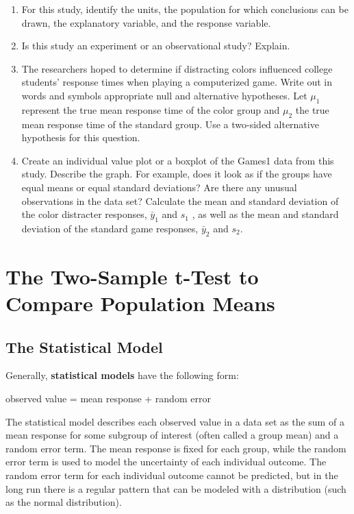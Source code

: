 \documentclass[
]{report}
\begin{document}
\begin{enumerate}
\def\labelenumi{\arabic{enumi}.}
\item
  For this study, identify the units, the population for which conclusions can be drawn, the explanatory variable, and the response variable.
\item
  Is this study an experiment or an observational study? Explain.
\item
  The researchers hoped to determine if distracting colors influenced college students' response times when playing a computerized game. Write out in words and symbols appropriate null and alternative hypotheses. Let \(\mu_1\) represent the true mean response time of the color group and \(\mu_2\) the true mean response time of the standard group. Use a two-sided alternative hypothesis for this question.
\item
  Create an individual value plot or a boxplot of the Games1 data from this study. Describe the graph. For example, does it look as if the groups have equal means or equal standard deviations? Are there any unusual observations in the data set? Calculate the mean and standard deviation of the color distracter responses, \(\bar{y}_1\) and \(s_1\) , as well as the mean and standard deviation of the standard game responses, \(\bar{y}_2\) and \(s_2\).
\end{enumerate}

\newpage

\section{The Two-Sample t-Test to Compare Population Means}\label{the-two-sample-t-test-to-compare-population-means}

\subsection{The Statistical Model}\label{the-statistical-model}

Generally, \textbf{statistical models} have the following form:

observed value = mean response + random error

The statistical model describes each observed value in a data set as the sum of a mean response for some subgroup of interest (often called a group mean) and a random error term. The mean response is fixed for each group, while the random error term is used to model the uncertainty of each individual outcome. The random error term for each individual outcome cannot be predicted, but in the long run there is a regular pattern that can be modeled with a distribution (such as the normal distribution).
\end{document}
